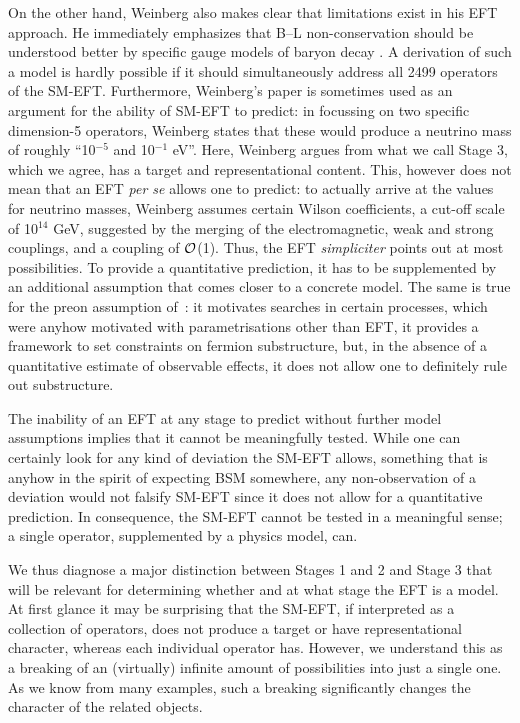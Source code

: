On the other hand, Weinberg also makes clear that limitations exist in his EFT approach. 
He immediately emphasizes that B--L non-conservation should be understood better by specific gauge models of baryon decay \citep[p.~1569]{Weinberg:1979sa}.
A derivation of such a model is hardly possible if it should simultaneously address all 2499 operators of the SM-EFT.
Furthermore, Weinberg's paper is sometimes used as an argument for the ability of SM-EFT to predict: in focussing on two specific dimension-5 operators, Weinberg states that these would produce a neutrino mass of roughly ``10$^{-5}$ and 10$^{-1}$ eV''.
Here, Weinberg argues from what we call Stage 3, which we agree, has a target and representational content.
This, however does not mean that an EFT \textit{per se} allows one to predict: to actually arrive at the values for neutrino masses,
Weinberg assumes certain Wilson coefficients, a cut-off scale of 
10$^{14}$ GeV, suggested by the merging of the electromagnetic, weak and strong couplings, and a coupling of $\cal{O}$(1).
Thus, the EFT \textit{simpliciter} points out at most possibilities. 
To provide a quantitative prediction, it has to be supplemented by an additional assumption that comes closer to a concrete model.
The same is true for the preon assumption of~\cite{Eichten:1983hw}: it motivates searches in certain processes, which were anyhow motivated with parametrisations other than EFT, it provides a framework to set constraints on fermion substructure, but, in the absence of a quantitative estimate of observable effects, it does not allow one to definitely rule out substructure. 

The inability of an EFT at any stage to predict without further model assumptions implies that it cannot be meaningfully tested.
While one can certainly look for any kind of deviation the SM-EFT allows, something that is anyhow in the spirit of expecting BSM somewhere, any non-observation of a deviation would not falsify SM-EFT since it does not allow for a quantitative prediction.  
In consequence, the SM-EFT cannot be tested in a meaningful sense; 
a single operator, supplemented by a physics model, can. 

We thus diagnose a major distinction between Stages 1 and 2 and Stage 3 that will be relevant for determining whether and at what stage the EFT is a model. 
At first glance it may be surprising that the SM-EFT, if interpreted as a collection of operators, does not produce a target or have representational character, whereas each individual operator has.
However, we understand this as a breaking of an (virtually) infinite amount of possibilities into just a single one.
As we know from many examples, such a breaking significantly changes the character of the related objects.
  
